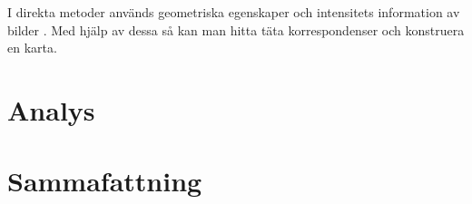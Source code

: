 I direkta metoder används geometriska egenskaper och intensitets information av bilder \citep{geospatial}. Med hjälp av dessa så kan man hitta täta korrespondenser och konstruera en karta. 

\chapter{Analys}

\chapter{Sammafattning}

\iffalse
Mäst är inomhus av drönaren
Problem med beräkning, pga batteri kapacitet och komplexa algoritmer och bildbearbetningsalgoritmer
\fi

